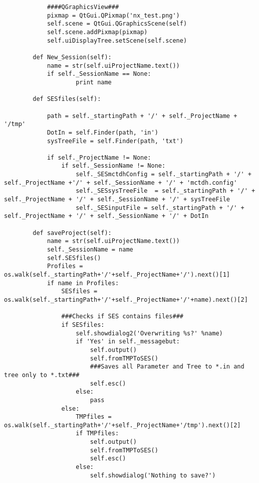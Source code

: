 \begin{verbatim}
            ####QGraphicsView###
            pixmap = QtGui.QPixmap('nx_test.png')
            self.scene = QtGui.QGraphicsScene(self)
            self.scene.addPixmap(pixmap)
            self.uiDisplayTree.setScene(self.scene)
    
        def New_Session(self):
            name = str(self.uiProjectName.text())
            if self._SessionName == None:
                    print name
    
        def SESfiles(self):
            
            path = self._startingPath + '/' + self._ProjectName + '/tmp'
            DotIn = self.Finder(path, 'in')
            sysTreeFile = self.Finder(path, 'txt')
    
            if self._ProjectName != None:
                if self._SessionName != None:
                    self._SESmctdhConfig = self._startingPath + '/' + self._ProjectName +'/' + self._SessionName + '/' + 'mctdh.config'
                    self._SESsysTreeFile  = self._startingPath + '/' + self._ProjectName + '/' + self._SessionName + '/' + sysTreeFile
                    self._SESinputFile = self._startingPath + '/' + self._ProjectName + '/' + self._SessionName + '/' + DotIn
    
        def saveProject(self):
            name = str(self.uiProjectName.text())
            self._SessionName = name
            self.SESfiles()
            Profiles = os.walk(self._startingPath+'/'+self._ProjectName+'/').next()[1]
            if name in Profiles:
                SESfiles = os.walk(self._startingPath+'/'+self._ProjectName+'/'+name).next()[2]
    
                ###Checks if SES contains files###        
                if SESfiles:
                    self.showdialog2('Overwriting %s?' %name)
                    if 'Yes' in self._messagebut:
                        self.output()  
                        self.fromTMPToSES()
                        ###Saves all Parameter and Tree to *.in and tree only to *.txt### 
                        self.esc()
                    else:
                        pass
                else:
                    TMPfiles = os.walk(self._startingPath+'/'+self._ProjectName+'/tmp').next()[2]
                    if TMPfiles:
                        self.output()
                        self.fromTMPToSES()
                        self.esc()
                    else:
                        self.showdialog('Nothing to save?')
    

\end{verbatim}
